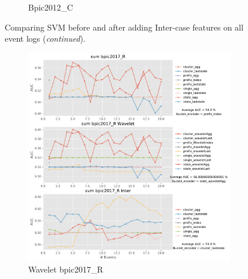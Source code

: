 \documentclass[twoside,11pt]{Latex/Classes/PhDthesisPSnPDF}
\begin{document}
\begin{figure}[!htbp]
\begin{subfigure}{0.48\textwidth}
		\caption{Bpic2012\_C} \label{fig:b12ci}
	\end{subfigure}	
\caption{Comparing SVM before and after adding Inter-case features on all event logs  (\textit{continued}).}
\label{fig:inters2}
\end{figure}


\begin{figure}[!htbp] %
	
	\begin{subfigure}{0.48\textwidth}
		\includegraphics[width=\linewidth]{images/inter/svm/bpic2017_R.pdf}
		\caption{Wavelet bpic2017\_R} \label{fig:b17ri}
	\end{subfigure}\hspace*{\fill}
	\begin{subfigure}{0.48\textwidth}

\end{subfigure}
\end{figure}
\end{document}
